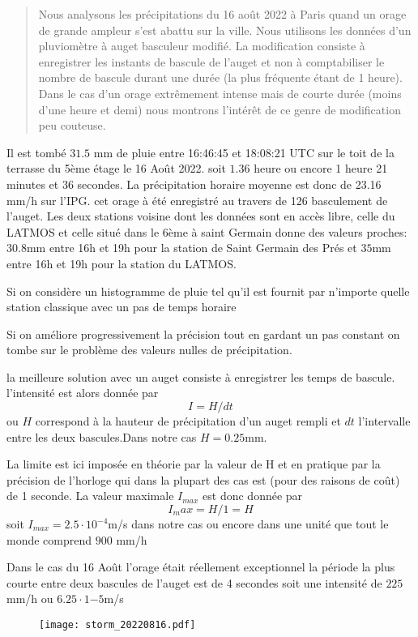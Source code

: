 \documentclass[12pt,a4paper]{article}
\begin{document}
\begin{abstract}
Nous analysons les précipitations du 16 août 2022 à Paris quand un orage de grande ampleur s'est abattu sur la ville. Nous utilisons les données d'un pluviomètre à auget basculeur modifié. La modification consiste à enregistrer les instants de bascule de l'auget et non  à comptabiliser le nombre de bascule durant une durée (la plus fréquente étant de 1 heure). Dans le cas d'un orage extrêmement intense mais de courte durée (moins d'une heure et demi) nous montrons l'intérêt de ce genre de modification peu couteuse.
\end{abstract}

Il est tombé $31.5$ mm de pluie entre 16:46:45 et 18:08:21 UTC sur le toit de la terrasse du 5ème étage le 16 Août 2022.
soit $1.36$ heure ou encore 1 heure 21 minutes et 36 secondes. La précipitation horaire moyenne est donc de  23.16 mm/h sur l'IPG. 
cet orage à été enregistré au travers de 126 basculement de l'auget.
Les deux stations voisine dont les données sont en accès libre, celle du LATMOS et celle situé dans le 6ème à saint Germain donne des valeurs proches: $30.8$mm entre 16h et 19h pour la station de Saint Germain des Prés et $35$mm entre 16h et 19h pour la station du LATMOS.

Si on considère un histogramme de pluie tel qu'il est fournit par n'importe quelle station classique avec un pas de temps horaire

Si on améliore progressivement la précision tout en gardant un pas constant on tombe sur le problème des valeurs nulles de précipitation. 

la meilleure solution avec un auget consiste à enregistrer les temps de bascule. l'intensité est alors donnée par
\begin{equation}
I = H/dt 
\end{equation}
ou $H$ correspond à la hauteur de précipitation d'un auget rempli et $dt$ l'intervalle entre les deux bascules.Dans notre cas $H=0.25$mm. 

La limite est ici imposée en théorie par la valeur de H et en pratique par la précision de l'horloge qui dans la plupart des cas est (pour des raisons de coût) de 1 seconde. La valeur maximale $I_{max}$ est donc donnée par
\begin{equation}
I_max = H/1 = H
\end{equation}
soit $I_{max} = 2.5\cdot 10^{-4}$m/s dans notre cas ou encore dans une unité que tout le monde comprend $900$ mm/h

Dans le cas du 16 Août l'orage était réellement exceptionnel la période la plus courte entre deux bascules de l'auget est de 4 secondes soit une intensité de $225$mm/h ou $6.25\cdot 1{-5}$m/s 


\begin{figure}[hbtp]
\centering
\texttt{[image: storm\_20220816.pdf]}
\caption{}
\end{figure}
\end{document}
